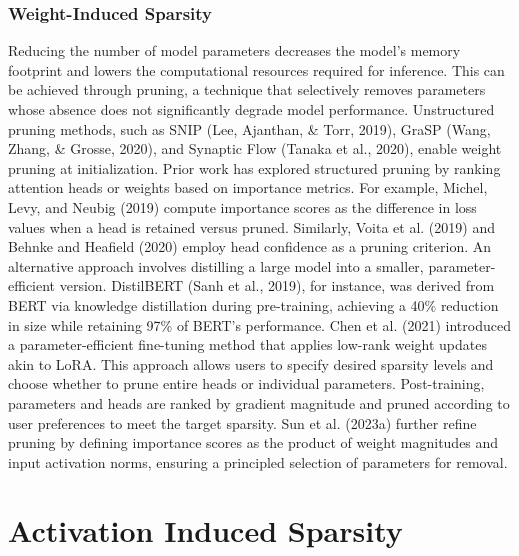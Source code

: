 \documentclass[conference]{IEEEtran}
\begin{document}
\subsubsection*{Weight-Induced Sparsity}
Reducing the number of model parameters decreases the model's memory footprint and lowers the computational resources required for inference. This can be achieved through pruning, a technique that selectively removes parameters whose absence does not significantly degrade model performance. Unstructured pruning methods, such as SNIP (Lee, Ajanthan, \& Torr, 2019), GraSP (Wang, Zhang, \& Grosse, 2020), and Synaptic Flow (Tanaka et al., 2020), enable weight pruning at initialization. Prior work has explored structured pruning by ranking attention heads or weights based on importance metrics. For example, Michel, Levy, and Neubig (2019) compute importance scores as the difference in loss values when a head is retained versus pruned. Similarly, Voita et al. (2019) and Behnke and Heafield (2020) employ head confidence as a pruning criterion. An alternative approach involves distilling a large model into a smaller, parameter-efficient version. DistilBERT (Sanh et al., 2019), for instance, was derived from BERT via knowledge distillation during pre-training, achieving a 40\% reduction in size while retaining 97\% of BERT’s performance. Chen et al. (2021) introduced a parameter-efficient fine-tuning method that applies low-rank weight updates akin to LoRA. This approach allows users to specify desired sparsity levels and choose whether to prune entire heads or individual parameters. Post-training, parameters and heads are ranked by gradient magnitude and pruned according to user preferences to meet the target sparsity. Sun et al. (2023a) further refine pruning by defining importance scores as the product of weight magnitudes and input activation norms, ensuring a principled selection of parameters for removal.




\section{Activation Induced Sparsity}
\end{document}
